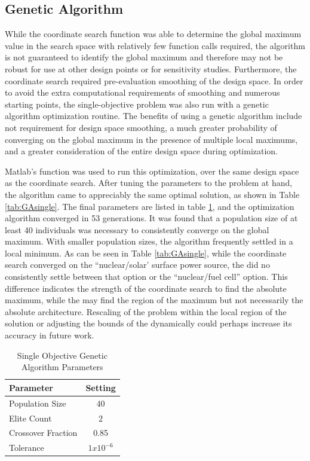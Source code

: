 \documentclass[]{aiaa-pretty}
\begin{document}
\subsection{Genetic Algorithm}
\label{sec:gasingle}


While the coordinate search function was able to determine the global maximum value in the search space with relatively few function calls required, the algorithm is not guaranteed to identify the global maximum and therefore may not be robust for use at other design points or for sensitivity studies. Furthermore, the coordinate search required pre-evaluation smoothing of the design space. In order to avoid the extra computational requirements of smoothing and numerous starting points, the single-objective problem was also run with a genetic algorithm optimization routine. The benefits of using a genetic algorithm include not requirement for design space smoothing, a much greater probability of converging on the global maximum in the presence of multiple local maximums, and a greater consideration of the entire design space during optimization.

Matlab's  function was used to run this optimization, over the same design space as the coordinate search. After tuning the  parameters to the problem at hand, the algorithm came to appreciably the same optimal solution, as shown in Table \ref{tab:GAsingle}. The final  parameters are listed in table \ref{tab:gasingleparams}, and the optimization algorithm converged in 53 generations. It was found that a population size of at least 40 individuals was necessary to consistently converge on the global maximum. With smaller population sizes, the algorithm frequently settled in a local minimum. As can be seen in Table \ref{tab:GAsingle}, while the coordinate search converged on the ``nuclear/solar' surface power source, the  did no consistently settle between that option or the ``nuclear/fuel cell'' option. This difference indicates the strength of the coordinate search to find the absolute maximum, while the  may find the region of the maximum but not necessarily the absolute architecture. Rescaling of the problem within the local region of the solution or adjusting the bounds of the  dynamically could perhaps increase its accuracy in future work.


\begin{table}[h]
	\centering
	\caption{Single Objective Genetic Algorithm Parameters}
	\label{tab:gasingleparams}
	\begin{tabular}{lc}
		\textbf{Parameter} & \textbf{Setting} \\ \hline
		Population Size & 40\\
		Elite Count & 2\\
		Crossover Fraction & 0.85\\
		Tolerance & $1x10^{-6}$\\
	\end{tabular}
	\end{table}
\end{document}
